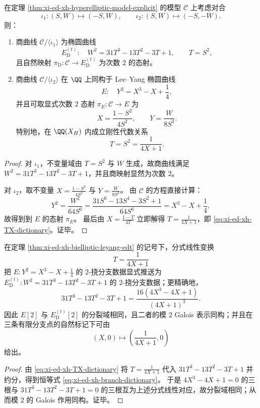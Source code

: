 \begin{theorem}\label{thm:xi-ed-xh-bielliptic-leyang-edt}
在定理 \ref{thm:xi-ed-xh-hyperelliptic-model-explicit} 的模型 \(\mathcal C\) 上考虑对合
\[
\iota_1:(S,W)\longmapsto(-S,W),
\qquad
\iota_2:(S,W)\longmapsto(-S,-W).
\]
则：
\begin{enumerate}
  \item 商曲线 \(\mathcal C/\langle\iota_1\rangle\) 为椭圆曲线
  \[
  E_{\mathrm D}^{(t)}:\quad W^2=31T^3-13T^2-3T+1,\qquad T=S^2,
  \]
  且自然映射 \(\pi_{\mathrm D}:\mathcal C\to E_{\mathrm D}^{(t)}\) 为次数 \(2\) 的态射。
  \item 商曲线 \(\mathcal C/\langle\iota_2\rangle\) 在 \(\QQ\) 上同构于 Lee--Yang 椭圆曲线
  \[
  E:\quad Y^2=X^3-X+\frac14,
  \]
  并且可取显式次数 \(2\) 态射 \(\pi_E:\mathcal C\to E\) 为
  \begin{equation}\label{eq:xi-ed-xh-to-leyang-map}
  X=\frac{1-S^2}{4S^2},
  \qquad
  Y=\frac{W}{8S^3}.
  \end{equation}
  特别地，在 \(\QQ(X_H)\) 内成立刚性代数关系
  \begin{equation}\label{eq:xi-ed-xh-TX-dictionary}
  T=S^2=\frac{1}{4X+1}.
  \end{equation}
\end{enumerate}
\end{theorem}
\begin{proof}
对 \(\iota_1\)，不变量域由 \(T=S^2\) 与 \(W\) 生成，故商曲线满足 \(W^2=31T^3-13T^2-3T+1\)，并且商映射显然为次数 \(2\)。
\par
对 \(\iota_2\)，取不变量 \(X=\frac{1-S^2}{4S^2}\) 与 \(Y=\frac{W}{8S^3}\)。
由 \(\mathcal C\) 的方程直接计算：
\[
Y^2=\frac{W^2}{64S^6}
=\frac{31S^6-13S^4-3S^2+1}{64S^6}
=X^3-X+\frac14,
\]
故得到到 \(E\) 的态射 \(\pi_E\)。
最后由 \(X=\frac{1-T}{4T}\) 立即解得 \(T=\frac{1}{4X+1}\)，即 \eqref{eq:xi-ed-xh-TX-dictionary}。证毕。
\end{proof}

\begin{proposition}\label{prop:xi-ed-xh-2torsion-dictionary-mod2}
在定理 \ref{thm:xi-ed-xh-bielliptic-leyang-edt} 的记号下，分式线性变换
\[
T=\frac{1}{4X+1}
\]
把 \(E: Y^2=X^3-X+\tfrac14\) 的 \(2\)-挠分支数据显式推送为 \(E_{\mathrm D}^{(t)}:W^2=31T^3-13T^2-3T+1\) 的 \(2\)-挠分支数据；更精确地，
\begin{equation}\label{eq:xi-ed-xh-branch-dictionary}
31T^3-13T^2-3T+1
=\frac{16(4X^3-4X+1)}{(4X+1)^3}.
\end{equation}
因此 \(E[2]\) 与 \(E_{\mathrm D}^{(t)}[2]\) 的分裂域相同，且二者的模 \(2\) Galois 表示同构；并且在三条有限分支点的自然标记下可由
\[
(X,0)\longmapsto\left(\frac{1}{4X+1},0\right)
\]
给出。
\end{proposition}
\begin{proof}
由 \eqref{eq:xi-ed-xh-TX-dictionary} 将 \(T=\frac{1}{4X+1}\) 代入 \(31T^3-13T^2-3T+1\) 并约分，得到恒等式 \eqref{eq:xi-ed-xh-branch-dictionary}。
于是 \(4X^3-4X+1=0\) 的三根与 \(31T^3-13T^2-3T+1=0\) 的三根互为上述分式线性对应，故分裂域相同；从而模 \(2\) 的 Galois 作用同构。证毕。
\end{proof}

